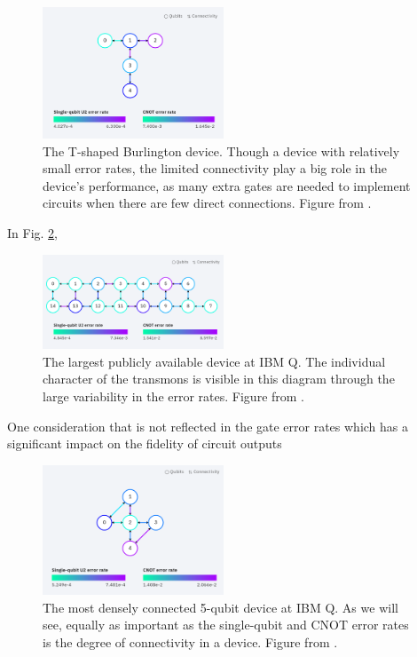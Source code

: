\begin{figure}[h]
  \includegraphics[width=0.48\textwidth]{images/connection_diagram_burlington.png}
  \caption{The T-shaped Burlington device. Though a device with relatively small
    error rates, the limited connectivity play a big role in the device's
    performance, as many extra gates are needed to implement circuits when there
    are few direct connections. Figure from \cite{ibmq_burlington}.}
  \label{fig:burlington_connections}
\end{figure}

In Fig. \ref{fig:melbourne_connections}, 

\begin{figure}[h]
  \includegraphics[width=0.48\textwidth]{images/connection_diagram_melbourne.png}
  \caption{The largest publicly available device at IBM Q. The individual
    character of the transmons is visible in this diagram through the large
    variability in the error rates. Figure from \cite{ibmq_16_melbourne}.}
  \label{fig:melbourne_connections}
\end{figure}

One consideration that is not reflected in the gate error rates which has a
significant impact on the fidelity of circuit outputs 

\begin{figure}[h]
  \includegraphics[width=0.48\textwidth]{images/connection_diagram_ibmqx2.png}
  \caption{The most densely connected 5-qubit device at IBM Q. As we will see,
    equally as important as the single-qubit and CNOT error rates is the degree
    of connectivity in a device. Figure from \cite{ibmq_yorktown}.}
  \label{fig:yorktown_connections}
\end{figure}

